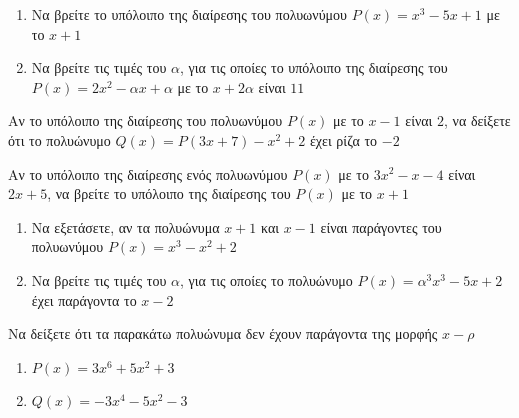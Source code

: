 \documentclass{../presentation}
\begin{document}
\begin{askisi}
  \begin{enumerate}
    \item<1-> Να βρείτε το υπόλοιπο της διαίρεσης του πολυωνύμου $P(x)=x^3-5x+1$ με το $x+1$
    \item<2-> Να βρείτε τις τιμές του $α$, για τις οποίες το υπόλοιπο της διαίρεσης του $P(x)=2x^2-αx+α$ με το $x+2α$ είναι $11$
  \end{enumerate}


\end{askisi}

\begin{askisi}
  Αν το υπόλοιπο της διαίρεσης του πολυωνύμου $P(x)$ με το $x-1$ είναι $2$, να δείξετε ότι το πολυώνυμο $Q(x)=P(3x+7)-x^2+2$ έχει ρίζα το $-2$


\end{askisi}

\begin{askisi}
  Αν το υπόλοιπο της διαίρεσης ενός πολυωνύμου $P(x)$ με το $3x^2-x-4$ είναι $2x+5$, να βρείτε το υπόλοιπο της διαίρεσης του $P(x)$ με το $x+1$


\end{askisi}

\begin{askisi}
  \begin{enumerate}
    \item<1-> Να εξετάσετε, αν τα πολυώνυμα $x+1$ και $x-1$ είναι παράγοντες του πολυωνύμου $P(x)=x^3-x^2+2$
    \item<2-> Να βρείτε τις τιμές του $α$, για τις οποίες το πολυώνυμο $P(x)=α^3x^3-5x+2$ έχει παράγοντα το $x-2$
  \end{enumerate}


\end{askisi}

\begin{askisi}
  Να δείξετε ότι τα παρακάτω πολυώνυμα δεν έχουν παράγοντα της μορφής $x-ρ$
  \begin{enumerate}
    \item<1-> $P(x)=3x^6+5x^2+3$
    \item<2-> $Q(x)=-3x^4-5x^2-3$
  \end{enumerate}


\end{askisi}
\end{document}
